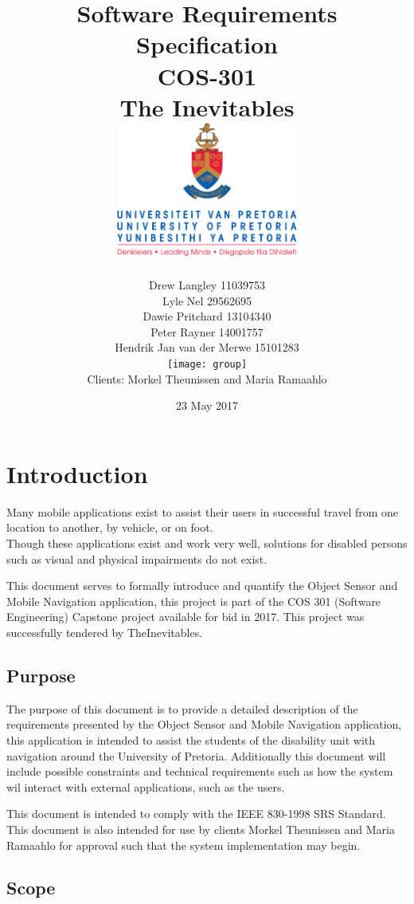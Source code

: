 \documentclass{article}
\title{ Software Requirements Specification \\ COS-301 \\ The Inevitables \\[0.5cm] \includegraphics[width=6cm]{front-page}}
\author{Drew Langley \hfill 11039753 \\ Lyle Nel \hfill 29562695 \\ Dawie Pritchard \hfill 13104340 \\  Peter Rayner \hfill 14001757\\ Hendrik Jan van der Merwe \hfill 15101283 \\ [1cm]\texttt{[image: group]}\\ [1cm] Clients: Morkel Theunissen and Maria Ramaahlo }
\date{23 May 2017}
\begin{document}
\maketitle
\pagebreak
\tableofcontents
\pagebreak


\section{Introduction}
		Many mobile applications exist to assist their users in successful travel from one location to another, by vehicle, or on foot. \\
		Though these applications exist and work very well, solutions for disabled persons such as visual and physical impairments do not exist.\\ \par
		This document serves to formally introduce and quantify the Object Sensor and Mobile Navigation application, this project is part of the COS 301 (Software Engineering) Capstone project available for bid in 2017. This project was successfully tendered by TheInevitables.
	
	\subsection{Purpose}
		The purpose of this document is to provide a detailed description of the requirements presented by the Object Sensor and Mobile Navigation application, this application is intended to assist the students of the disability unit with navigation around the University of Pretoria. Additionally this document will include possible constraints and technical requirements such as how the system wil interact with external applications, such as the users. \par
		This document is intended to comply with the IEEE 830-1998 SRS Standard. This document is also intended for use by clients Morkel Theunissen and Maria Ramaahlo for approval such that the system implementation may begin.
		
	\subsection{Scope}
\end{document}
